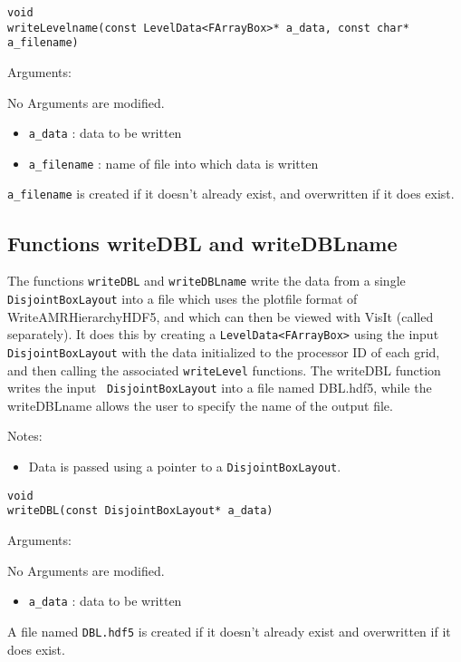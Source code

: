 \begin{verbatim}
void
writeLevelname(const LevelData<FArrayBox>* a_data, const char* a_filename)
\end{verbatim}  

Arguments:

No Arguments are modified.
\begin{itemize}
\item \verb|a_data| : data to be written
\item \verb|a_filename| : name of file into which data is written
\end{itemize}

\verb+a_filename+ is created if it doesn't already exist, and overwritten
if it does exist.  



\subsection{Functions writeDBL and writeDBLname}
The functions \protect\verb|writeDBL| and \protect\verb|writeDBLname|
write the data from a single {\tt DisjointBoxLayout} into a file which
uses the plotfile format of WriteAMRHierarchyHDF5, and which can
then be viewed with VisIt (called separately). It does this by
creating a {\tt LevelData<FArrayBox>} using the input {\tt
  DisjointBoxLayout} with the data initialized to the processor ID of
 each grid, and then calling the associated {\tt writeLevel}
functions. The writeDBL function writes the input {\tt
  DisjointBoxLayout} into a file named DBL.hdf5, while the
writeDBLname allows the user to specify the name of the output file.   

Notes:
\begin{itemize}
\item Data is passed using a pointer to a {\tt DisjointBoxLayout}. 
\end{itemize}

\begin{verbatim}
void
writeDBL(const DisjointBoxLayout* a_data)
\end{verbatim}  

Arguments:

No Arguments are modified.
\begin{itemize}
\item \verb|a_data| : data to be written
\end{itemize}

A file named \verb|DBL.hdf5| is created if it doesn't already exist and
overwritten if it does exist. 



